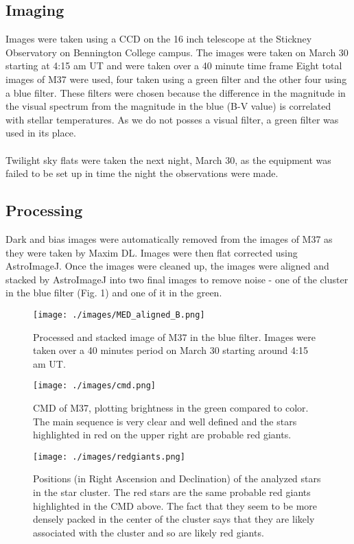 \documentclass[12pt]{article}
\begin{document}
		\subsection{Imaging}
			Images were taken using a CCD on the 16 inch telescope at the Stickney Observatory on Bennington College campus. The images were taken on March 30 starting at 4:15 am UT and were taken over a 40 minute time frame Eight total images of M37 were used, four taken using a green filter and the other four using a blue filter. These filters were chosen because the difference in the magnitude in the visual spectrum from the magnitude in the blue (B-V value) is correlated with stellar temperatures. As we do not posses a visual filter, a green filter was used in its place.
			\\\\
			Twilight sky flats were taken the next night, March 30, as the equipment was failed to be set up in time the night the observations were made. 
	
		\subsection{Processing}
			Dark and bias images were automatically removed from the images of M37 as they were taken by Maxim DL. Images were then flat corrected using AstroImageJ. Once the images were cleaned up, the images were aligned and stacked by AstroImageJ into two final images to remove noise - one of the cluster in the blue filter (Fig. 1) and one of it in the green.
	
		\begin{figure}
			\texttt{[image: ./images/MED\_aligned\_B.png]}
			\caption{Processed and stacked image of M37 in the blue filter. Images were taken over a 40 minutes period on March 30 starting around 4:15 am UT.}
		\end{figure}
		
		\begin{figure}
			\texttt{[image: ./images/cmd.png]}
			\caption{CMD of M37, plotting brightness in the green compared to color. The main sequence is very clear and well defined and the stars highlighted in red on the upper right are probable red giants.}
		\end{figure}	
					
		\begin{figure}
			\texttt{[image: ./images/redgiants.png]}
			\caption{Positions (in Right Ascension and Declination) of the analyzed stars in the star cluster. The red stars are the same probable red giants highlighted in the CMD above. The fact that they seem to be more densely packed in the center of the cluster says that they are likely associated with the cluster and so are likely red giants.}
		\end{figure}
	
\end{document}

